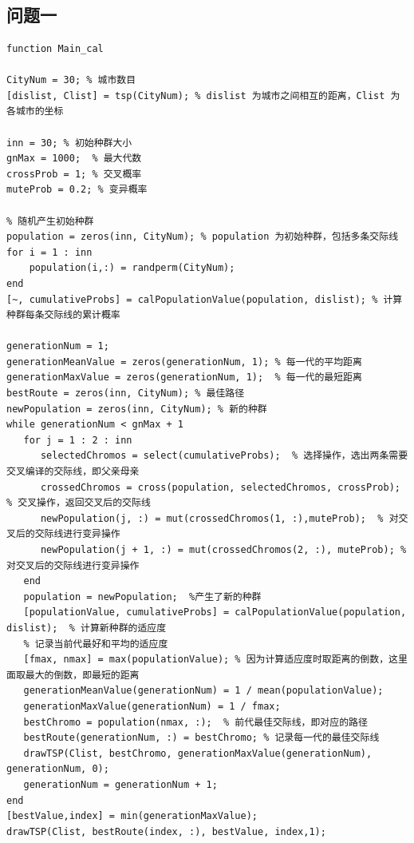 \documentclass{article}
\begin{document}
\section*{}
\begin{appendices}
    \section{问题一}
        \begin{lstlisting}
function Main_cal

CityNum = 30; % 城市数目
[dislist, Clist] = tsp(CityNum); % dislist 为城市之间相互的距离，Clist 为各城市的坐标

inn = 30; % 初始种群大小
gnMax = 1000;  % 最大代数
crossProb = 1; % 交叉概率
muteProb = 0.2; % 变异概率
 
% 随机产生初始种群
population = zeros(inn, CityNum); % population 为初始种群，包括多条交际线
for i = 1 : inn
    population(i,:) = randperm(CityNum);
end
[~, cumulativeProbs] = calPopulationValue(population, dislist); % 计算种群每条交际线的累计概率
 
generationNum = 1;
generationMeanValue = zeros(generationNum, 1); % 每一代的平均距离
generationMaxValue = zeros(generationNum, 1);  % 每一代的最短距离
bestRoute = zeros(inn, CityNum); % 最佳路径
newPopulation = zeros(inn, CityNum); % 新的种群
while generationNum < gnMax + 1
   for j = 1 : 2 : inn
      selectedChromos = select(cumulativeProbs);  % 选择操作，选出两条需要交叉编译的交际线，即父亲母亲
      crossedChromos = cross(population, selectedChromos, crossProb);  % 交叉操作，返回交叉后的交际线
      newPopulation(j, :) = mut(crossedChromos(1, :),muteProb);  % 对交叉后的交际线进行变异操作
      newPopulation(j + 1, :) = mut(crossedChromos(2, :), muteProb); % 对交叉后的交际线进行变异操作
   end
   population = newPopulation;  %产生了新的种群
   [populationValue, cumulativeProbs] = calPopulationValue(population, dislist);  % 计算新种群的适应度
   % 记录当前代最好和平均的适应度
   [fmax, nmax] = max(populationValue); % 因为计算适应度时取距离的倒数，这里面取最大的倒数，即最短的距离
   generationMeanValue(generationNum) = 1 / mean(populationValue); 
   generationMaxValue(generationNum) = 1 / fmax;   
   bestChromo = population(nmax, :);  % 前代最佳交际线，即对应的路径
   bestRoute(generationNum, :) = bestChromo; % 记录每一代的最佳交际线
   drawTSP(Clist, bestChromo, generationMaxValue(generationNum), generationNum, 0);
   generationNum = generationNum + 1;
end
[bestValue,index] = min(generationMaxValue);
drawTSP(Clist, bestRoute(index, :), bestValue, index,1);
 

\end{lstlisting}
\end{appendices}
\end{document}
